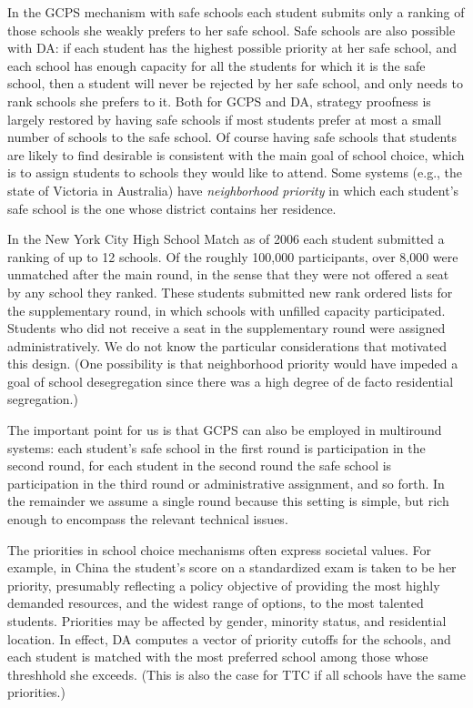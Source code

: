 \documentclass[12pt, A4paper]{article}
\theoremstyle{definition}
\begin{document}
In the GCPS mechanism with safe schools each student submits only a ranking of those schools she weakly prefers to her safe school.  
Safe schools are also possible with DA: if each student has the highest possible priority at her safe school, and each school has enough capacity for all the students for which it is the safe school, then a student will never be rejected by her safe school, and only needs to rank schools she prefers to it.
Both for GCPS and DA, strategy proofness is largely restored by having safe schools if most students prefer at most a small number of schools to the safe school. 
Of course having safe schools that students are likely to find  desirable is consistent with the main goal of school choice, which is to assign students to schools they would like to attend. Some systems (e.g., the state of Victoria in Australia) have \emph{neighborhood priority} in which each student's safe school is the one whose district contains her residence.

In the New York City High School Match as of 2006 \citep{Pat06} each student submitted a ranking of up to 12 schools.  Of the roughly 100,000 participants, over 8,000 were unmatched after the main round, in the sense that they were not offered a seat by any school they ranked.  These students submitted new rank ordered lists for the supplementary round, in which schools with unfilled capacity participated.  Students who did not receive a seat in the supplementary round were assigned administratively.  We do not know the particular considerations that motivated this design.  (One possibility is that neighborhood priority would have impeded a goal of school desegregation since there was a high degree of de facto residential segregation.) 

The important point for us is that GCPS can also be employed in multiround systems: each student's safe school in the first round is participation in the second round, for each student in the second round the safe school is participation in the third round or administrative assignment, and so forth.  In the remainder we assume a single round because this setting is simple, but rich enough to encompass the relevant technical issues.

The priorities in school choice mechanisms often express societal values.  
For example, in China \citep{WaZh20} the student's score on a standardized exam is taken to be her priority, presumably reflecting a policy objective of providing the most highly demanded resources, and the widest range of options, to the most talented students.  
Priorities may be affected by gender, minority status, and residential location.
In effect, DA computes a vector of priority cutoffs for the schools, and each student is matched with the most preferred school among those whose threshhold she exceeds.   (This is also the case for TTC if all schools have the same priorities.)  
\end{document}
